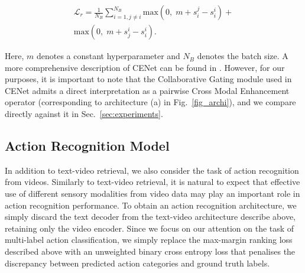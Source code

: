 \begin{align}
    \mathcal{L}_{r} = \frac{1}{N_B} \sum_{i=1, j\neq i}^{N_B}  \text{max}(0, \; m + s_i^j - s_i^i) + \nonumber \\
    \text{max}(0,\; m + s_j^i - s_i^i). \label{eqn:loss}
\end{align}

Here, $m$ denotes a constant hyperparameter and $N_B$ denotes the batch size.  A more comprehensive description of CENet can be found in \cite{liu2019use}. However, for our purposes, it is important to note that the Collaborative Gating module used in CENet admits a direct interpretation as a pairwise Cross Modal Enhancement operator (corresponding to architecture (a) in Fig.~\ref{fig_archi}), and we compare directly against it in Sec.~\ref{sec:experiments}.  


\subsection{Action Recognition Model}

In addition to text-video retrieval, we also consider the task of action recognition from videos. Similarly to text-video retrieval, it is natural to expect  that effective use of different sensory modalities from video data may play an important role in action recognition performance.  To obtain an action recognition architecture, we simply discard the text decoder from the text-video architecture describe above, retaining only the video encoder.   Since we focus on our attention on the task of multi-label action classification, we simply replace the max-margin ranking loss described above with an unweighted binary cross entropy loss that penalises the discrepancy between predicted action categories and ground truth labels.
